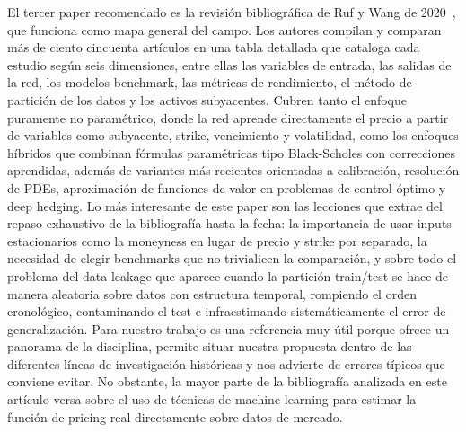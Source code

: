 \documentclass[11pt,a4paper]{article}
\begin{document}
El tercer paper recomendado es la revisión bibliográfica de Ruf y Wang de 2020~\cite{ruf2020}, que funciona como mapa general del campo. Los autores compilan y comparan más de ciento cincuenta artículos en una tabla detallada que cataloga cada estudio según seis dimensiones, entre ellas las variables de entrada, las salidas de la red, los modelos benchmark, las métricas de rendimiento, el método de partición de los datos y los activos subyacentes. Cubren tanto el enfoque puramente no paramétrico, donde la red aprende directamente el precio a partir de variables como subyacente, strike, vencimiento y volatilidad, como los enfoques híbridos que combinan fórmulas paramétricas tipo Black-Scholes con correcciones aprendidas, además de variantes más recientes orientadas a calibración, resolución de PDEs, aproximación de funciones de valor en problemas de control óptimo y deep hedging. Lo más interesante de este paper son las lecciones que extrae del repaso exhaustivo de la bibliografía hasta la fecha: la importancia de usar inputs estacionarios como la moneyness en lugar de precio y strike por separado, la necesidad de elegir benchmarks que no trivialicen la comparación, y sobre todo el problema del data leakage que aparece cuando la partición train/test se hace de manera aleatoria sobre datos con estructura temporal, rompiendo el orden cronológico, contaminando el test e infraestimando sistemáticamente el error de generalización. Para nuestro trabajo es una referencia muy útil porque ofrece un panorama de la disciplina, permite situar nuestra propuesta dentro de las diferentes líneas de investigación históricas y nos advierte de errores típicos que conviene evitar. No obstante, la mayor parte de la bibliografía analizada en este artículo versa sobre el uso de técnicas de machine learning para estimar la función de pricing real directamente sobre datos de mercado.
\end{document}
